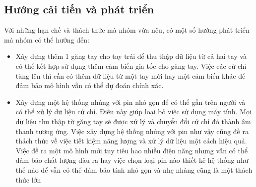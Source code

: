 \subsection{Hướng cải tiến và phát triển}
\indent Với những hạn chế và thách thức mà nhóm vừa nêu, có một số hướng phát triển mà nhóm có thể hướng đến:
\begin{itemize}
    \item Xây dựng thêm 1 găng tay cho tay trái để thu thập dữ liệu từ cả hai tay và có thể kết hợp sử dụng thêm cảm biến gia tốc cho găng tay. Việc các cử chỉ tăng lên thì cần có thêm dữ liệu từ một tay mới hay một cảm biến khác để đảm bảo mô hình vẫn có thể dự đoán chính xác.
    \item Xây dựng một hệ thống nhúng với pin nhỏ gọn để có thể gắn trên người và có thể xử lý dữ liệu cử chỉ. Điều này giúp loại bỏ việc sử dụng máy tính. Mọi dữ liệu thu thập từ găng tay sẽ được xử lý và chuyển đổi cử chỉ đó thành âm thanh tương ứng. Việc xây dựng hệ thống nhúng với pin như vậy cũng đề ra thách thức về việc tiết kiệm năng lượng và xử lý dữ liệu một cách hiệu quả. Việc đề ra một mô hình mới tuy tiêu hao nhiều điện năng nhưng vẫn có thể đảm bảo chất lượng đàu ra hay việc chọn loại pin nào thiết kê hệ thống như thế nào để vẫn có thể đảm bảo tính nhỏ gọn và nhẹ nhàng cũng là một thách thức lớn 
\end{itemize}